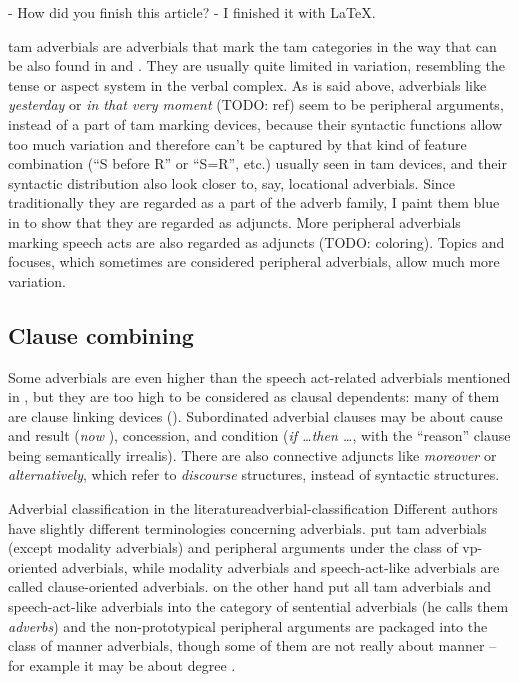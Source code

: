 \documentclass[UTF8, a4paper, oneside, scheme=plain, 12pt]{ctexbook}
\newcommand*{\citepage}[1]{p.~{#1}}
\newcommand*{\term}[1]{\emph{#1}}
\newcommand{\form}[1]{\emph{#1}}
\begin{document}
\begin{exe}
    \ex\label{ex:simple-clause.dependents.ex-3} - How did you finish this article? 
    - I finished it with LaTeX.
\end{exe}


\acs{tam} adverbials are adverbials that mark the \acs{tam} categories 
in the way that can be also found in 
and .
They are usually quite limited in variation,
resembling the tense or aspect system in the verbal complex.
As is said above, adverbials like \form{yesterday} or \form{in that very moment} (TODO: ref)
seem to be peripheral arguments, instead of a part of \acs{tam} marking devices,
because their syntactic functions allow too much variation 
and therefore can't be captured by that kind of feature combination 
(``S before R'' or ``S=R'', etc.)
usually seen in \acs{tam} devices,
and their syntactic distribution also look closer to, say, locational adverbials.
Since traditionally they are regarded as a part of the adverb family, 
I paint them blue in  to show that they are regarded as adjuncts.
More peripheral adverbials marking speech acts are also regarded as adjuncts (TODO: coloring).
Topics and focuses, which sometimes are considered peripheral adverbials,
allow much more variation. 

\subsection{Clause combining}

Some adverbials are even higher than the speech act-related adverbials 
mentioned in ,
but they are too high to be considered as clausal dependents:
many of them are clause linking devices ().
Subordinated adverbial clauses may be about 
cause and result (\form{now }), 
concession, 
and condition (\form{if \dots then \dots}, with the ``reason'' clause being semantically irrealis).
There are also connective adjuncts like \form{moreover} or \form{alternatively},
which refer to \emph{discourse} structures, instead of syntactic structures.



\begin{infobox}{Adverbial classification in the literature}{adverbial-classification}
    Different authors have slightly different terminologies concerning adverbials.
    \citet[\citepage{576}]{cgel} put \acs{tam} adverbials (except modality adverbials) 
    and peripheral arguments
    under the class of \acs{vp}-oriented adverbials, 
    while modality adverbials and speech-act-like adverbials are called clause-oriented adverbials.
    \citet[\citepage{386}]{dixon2005semantic} on the other hand 
    put all \acs{tam} adverbials and speech-act-like adverbials 
    into the category of sentential adverbials (he calls them \term{adverbs})
    and the non-prototypical peripheral arguments are packaged into the class of manner adverbials,
    though some of them are not really about manner -- 
    for example it may be about degree \citet[\citepage{576}]{cgel}.
\end{infobox}
\end{document}
